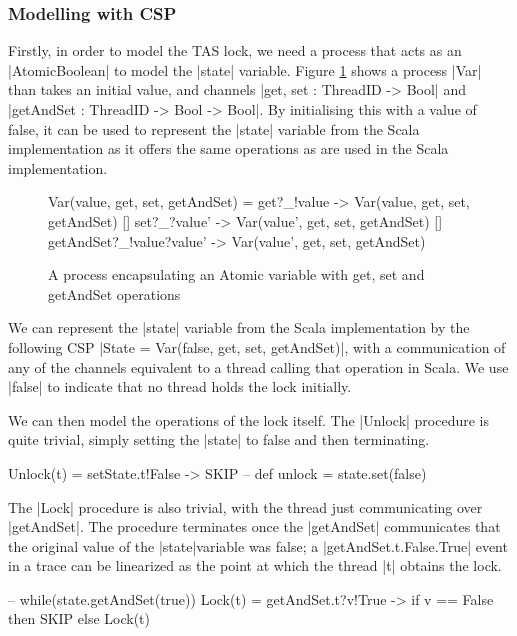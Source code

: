 \subsubsection{Modelling with CSP}

\inlineCSP

Firstly, in order to model the TAS lock, we need a process that acts as an |AtomicBoolean| to model the |state| variable. Figure \ref{csp:Variable} shows a process |Var| than takes an initial value, and channels |get, set : ThreadID -> Bool| and |getAndSet : ThreadID -> Bool -> Bool|. By initialising this with a value of false, it can be used to represent the |state| variable from the Scala implementation as it offers the same operations as are used in the Scala implementation.

\begin{figure}
  \begin{cspm}
  Var(value, get, set, getAndSet) = 
    get?_!value -> Var(value, get, set, getAndSet)
    [] set?_?value' -> Var(value', get, set, getAndSet)
    [] getAndSet?_!value?value' -> Var(value', get, set, getAndSet)
  \end{cspm}
  \caption{A process encapsulating an Atomic variable with get, set and getAndSet operations}
  \label{csp:Variable}
\end{figure}

We can represent the |state| variable from the Scala implementation by the following CSP |State = Var(false, get, set, getAndSet)|, with a communication of any of the channels equivalent to a thread calling that operation in Scala. We use |false| to indicate that no thread holds the lock initially.

We can then model the operations of the lock itself. The |Unlock| procedure is quite trivial, simply setting the |state| to false and then terminating.

\begin{cspm}
  Unlock(t) = setState.t!False -> SKIP -- def unlock = state.set(false)
\end{cspm}

The |Lock| procedure is also trivial, with the thread just communicating over |getAndSet|. The procedure terminates once the |getAndSet| communicates that the original value of the |state|variable was false; a |getAndSet.t.False.True| event in a trace can be linearized as the point at which the thread |t| obtains the lock.

\begin{cspm}
  -- while(state.getAndSet(true)){ }
  Lock(t) = getAndSet.t?v!True -> if v == False then SKIP 
                                    else Lock(t)
\end{cspm}

